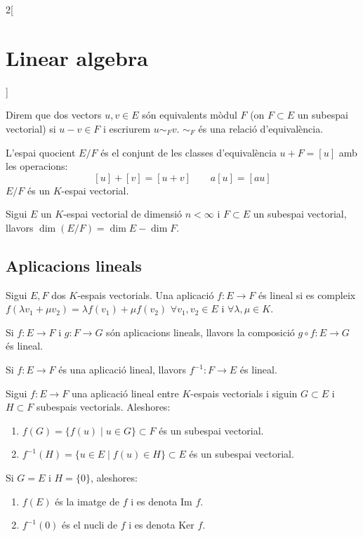 \documentclass[class=article,10pt,crop=false]{standalone}
\begin{document}
\begin{multicols}{2}[\section{Linear algebra}]
\begin{definition}
\end{definition}
\begin{definition}
Direm que dos vectors $u,v\in E$ són equivalents mòdul $F$ (on $F\subset E$ un subespai vectorial) si $u-v\in F$ i escriurem $u\sim_Fv$. $\sim_F$ és una relació d'equivalència.
\end{definition}
\begin{definition}
L'espai quocient $E/F$ és el conjunt de les classes d'equivalència $u+F=[u]$ amb les operacions:
$$[u]+[v]=[u+v]\qquad a[u]=[au]$$ $E/F$ és un $K$-espai vectorial.
\end{definition}
\begin{prop}
Sigui $E$ un $K$-espai vectorial de dimensió $n<\infty$ i $F\subset E$ un subespai vectorial, llavors $\dim (E/F)=\dim E-\dim F$.
\end{prop}
\subsection{Aplicacions lineals}
\begin{definition}
Sigui $E,F$ dos $K$-espais vectorials. Una aplicació $f:E\rightarrow F$ és lineal si es compleix $f(\lambda v_1+\mu v_2)=\lambda f(v_1)+\mu f(v_2)$ $\forall v_1,v_2\in E$ i $\forall\lambda,\mu\in K$.
\end{definition}
\begin{prop}
Si $f:E\rightarrow F$ i $g:F\rightarrow G$ són aplicacions lineals, llavors la composició $g\circ f:E\rightarrow G$ és lineal.
\end{prop}
\begin{prop}
Si $f:E\rightarrow F$ és una aplicació lineal, llavors $f^{-1}:F\rightarrow E$ és lineal.
\end{prop}
\begin{prop}
Sigui $f:E\rightarrow F$ una aplicació lineal entre $K$-espais vectorials i siguin $G\subset E$ i $H\subset F$ subespais vectorials. Aleshores:
\begin{enumerate}
    \item $f(G)=\{f(u)\mid u\in G\}\subset F$ és un subespai vectorial.
    \item $f^{-1}(H)=\{u\in E\mid f(u)\in H\}\subset E$ és un subespai vectorial.
\end{enumerate}
Si $G=E$ i $H=\{0\}$, aleshores:
\begin{enumerate}
    \item $f(E)$ és la imatge de $f$ i es denota $\text{Im }f$.
    \item $f^{-1}(0)$ és el nucli de $f$ i es denota $\text{Ker }f$.

\end{enumerate}
\end{prop}
\end{multicols}
\end{document}

